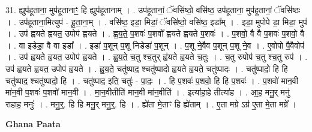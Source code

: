 \documentclass[17pt]{extarticle}
\begin{document}
31. ह्युप॑हूताना॒ मुप॑हूतानाꣳ॒॒ हि ह्युप॑हूतानाम् । . उप॑हूतानां॒ ॅवसि॑ष्ठो॒ वसि॑ष्ठ॒ उप॑हूताना॒ मुप॑हूतानां॒ ॅवसि॑ष्ठः । . उप॑हूताना॒मित्युप॑ - हू॒ता॒ना॒म् । . वसि॑ष्ठ॒ इडा॒ मिडां॒ ॅवसि॑ष्ठो॒ वसि॑ष्ठ॒ इडा᳚म् । . इडा॒ मुपोपे डा॒ मिडा॒ मुप॑ । . उप॑ ह्वयते ह्वयत॒ उपोप॑ ह्वयते । . ह्व॒य॒ते॒ प॒शवः॑ प॒शवो᳚ ह्वयते ह्वयते प॒शवः॑ । . प॒शवो॒ वै वै प॒शवः॑ प॒शवो॒ वै । . वा इडेडा॒ वै वा इडा᳚ । . इडा॑ प॒शून् प॒शू निडेडा॑ प॒शून् । . प॒शू ने॒वैव प॒शून् प॒शू ने॒व । . ए॒वोपो पै॒वैवोप॑ । . उप॑ ह्वयते ह्वयत॒ उपोप॑ ह्वयते । . ह्व॒य॒ते॒ च॒तु श्च॒तुर् ह्व॑यते ह्वयते च॒तुः । . च॒तु रुपोप॑ च॒तु श्च॒तु रुप॑ । . उप॑ ह्वयते ह्वयत॒ उपोप॑ ह्वयते । . ह्व॒य॒ते॒ चतु॑ष्पाद॒ श्चतु॑ष्पादो ह्वयते ह्वयते॒ चतु॑ष्पादः । . चतु॑ष्पादो॒ हि हि चतु॑ष्पाद॒ श्चतु॑ष्पादो॒ हि । . चतु॑ष्पाद॒ इति॒ चतुः॑ - पा॒दः॒ । . हि प॒शवः॑ प॒शवो॒ हि हि प॒शवः॑ । . प॒शवो॑ मान॒वी मा॑न॒वी प॒शवः॑ प॒शवो॑ मान॒वी । . मा॒न॒वीतीति॑ मान॒वी मा॑न॒वीति॑ । . इत्या॑हा॒हे तीत्या॑ह । . आ॒ह॒ मनु॒र् मनु॑ राहाह॒ मनुः॑ । . मनु॒र्॒. हि हि मनु॒र् मनु॒र्॒. हि । . ह्ये॑ता मे॒ताꣳ हि ह्ये॑ताम् । . ए॒ता मग्रे ऽग्र॑ ए॒ता मे॒ता मग्रे᳚ । \newline

\textbf{Ghana Paata } \newline
\end{document}
